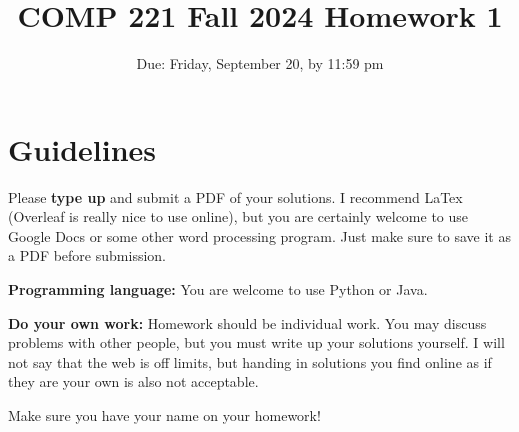 \documentclass{article}
\title{COMP 221 Fall 2024 Homework 1}
\date{Due: Friday, September 20, by 11:59 pm}
\begin{document}
\maketitle


\section{Guidelines}
Please \textbf{type up }and submit a PDF of your solutions.  I recommend LaTex (Overleaf is really nice to use online), but you are certainly welcome to use Google Docs or some other word processing program.  Just make sure to save it as a PDF before submission.

\textbf{Programming language:} You are welcome to use Python or Java.

\textbf{Do your own work:} Homework should be individual work.  You may discuss problems with other people, but you must write up your solutions yourself.  I will not say that the web is off limits, but handing in solutions you find online as if they are your own is also not acceptable.

Make sure you have your name on your homework!
\end{document}
